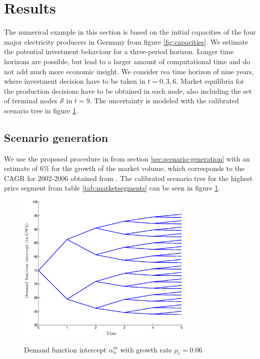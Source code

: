 \clearpage
\section{Results}
\label{sec:results}

The numerical example in this section is based on the initial capacities of the four major electricity producers in Germany from figure \ref{fig:capacities}. We estimate the potential investment behaviour for a three-period horizon. Longer time horizons are possible, but lead to a larger amount of computational time and do not add much more economic insight. We consider rea time horizon of nine years, where investment decision have to be taken in $t=0,3,6$. Market equilibria for the production decisions have to be obtained in each node, also including the set of terminal nodes $\mathcal{S}$ in $t=9$.  The uncertainty is modeled with the calibrated scenario tree in figure \ref{fig:intercept}.

\subsection{Scenario generation}

We use the proposed procedure in from section \ref{sec:scenario-generation} with an estimate of $6\%$ for the growth of the market volume, which corresponds to the CAGR for 2002-2006 obtained from \cite{Datamonitor2007}. The calibrated scenario tree for the highest price segment from table \ref{tab:marketsegments} can be seen in figure \ref{fig:intercept}.

\begin{figure}[htb]
  \centering
\caption{Demand function intercept $\alpha_n^m$ with growth rate $\rho_e=0.06$}
  \includegraphics[width=0.75\textwidth]{intercept}
  \label{fig:intercept}
\end{figure}



